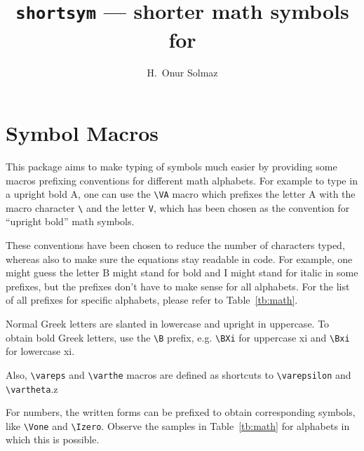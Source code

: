 \documentclass[]{article}
\title{\texttt{shortsym}\textnormal{ --- shorter math symbols for \LaTeXe}}
\author{H.\ Onur Solmaz}
\begin{document}
\maketitle
\section{Symbol Macros}

This package aims to make typing of symbols much easier by providing some macros
prefixing conventions for different math alphabets. For example to type in a
upright bold A, one can use the \verb+\VA+ macro which prefixes the letter A
with the macro character \verb+\+ and the letter \verb+V+, which has been chosen
as the convention for ``upright bold'' math symbols.

These conventions have been chosen to reduce the number of characters typed,
whereas also to make sure the equations stay readable in code. For example, one might guess
the letter B might stand for bold and I might stand for italic in some prefixes,
but the prefixes don't have to make sense for all alphabets.
For the list of all prefixes for
specific alphabets, please refer to Table~\ref{tb:math}.

Normal Greek letters are slanted in lowercase and upright in uppercase. To
obtain bold Greek letters, use the \verb+\B+ prefix, e.g. \verb+\BXi+ for
uppercase xi and \verb+\Bxi+ for lowercase xi.

Also, \verb+\vareps+ and \verb+\varthe+ macros are defined as shortcuts to
\verb+\varepsilon+ and \verb+\vartheta+.z

For numbers, the written forms can be prefixed to obtain corresponding symbols,
like \verb+\Vone+ and \verb+\Izero+. Observe the samples in Table~\ref{tb:math}
for alphabets in which this is possible.
\end{document}
